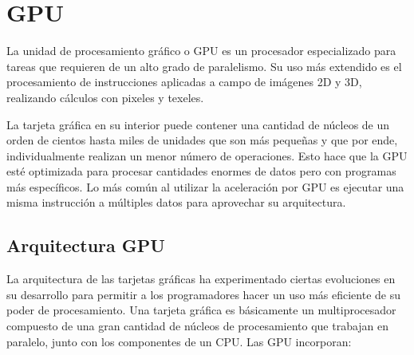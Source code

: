     \section{GPU}
   
    La unidad de procesamiento gráfico o GPU es un procesador especializado para tareas que requieren de un alto grado de paralelismo. Su uso más extendido es el procesamiento de instrucciones aplicadas a campo de imágenes 2D y 3D, realizando cálculos con pixeles y texeles\cite{TX2CU}.
\newline
   
   La tarjeta gráfica en su interior puede contener una cantidad de núcleos de un orden de cientos hasta miles de unidades que son más pequeñas y que por ende, individualmente realizan un menor número de operaciones. Esto hace que la GPU esté optimizada para procesar cantidades enormes de datos pero con programas más específicos\cite{gpgpu}. Lo más común al utilizar la aceleración por GPU es ejecutar una misma instrucción a múltiples datos para aprovechar su arquitectura.
   
    \subsection{Arquitectura GPU}

La arquitectura de las tarjetas gráficas ha experimentado ciertas evoluciones en su desarrollo para permitir a los programadores hacer un uso más eficiente de su poder de procesamiento. Una tarjeta gráfica es básicamente un multiprocesador compuesto de una gran cantidad de núcleos de procesamiento que trabajan en paralelo, junto con los componentes de un CPU. Las GPU incorporan:

